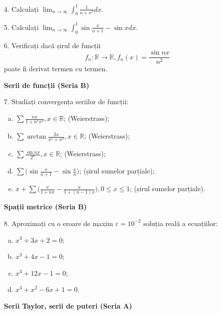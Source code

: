 \documentclass[11pt,a4paper]{article}
\newcommand\ds{\displaystyle}
\newcommand\RR{\mathbb{R}}
\theoremstyle{dotless}
\theoremstyle{dotlessdr}
\begin{document}
\vspace{1cm}

4. Calculați $\ds\lim_{n \to \infty} \int_0^1 \frac{1}{n + x^5} dx$.

\vspace{1cm}

5. Calculați $\ds\lim_{n \to \infty} \int_0^1 \sin \frac{x}{n + 1} - \sin x dx$.

\vspace{1cm}

6. Verificați dacă șirul de funcții
\[
  f_n : \RR \to \RR, f_n(x) = \frac{\sin nx}{n^2}
\]
poate fi derivat termen cu termen.

\vspace{1cm}

\textbf{Serii de funcții (Seria B)}

7. Studiați convergența seriilor de funcții:
\begin{enumerate}[(a)]
\item $\sum \frac{nx}{1 + n^5 x^2}, x \in \RR$; \hfill (Weierstrass);
\item $\sum \arctan \frac{2x}{x^2 + n^4}, x \in \RR$; \hfill (Weierstrass);
\item $\sum \frac{\sin nx}{2^n}, x \in \RR$; \hfill (Weierstrass);
\item $\sum \Big( \sin \frac{x}{n + 1} - \sin \frac{x}{n} \Big)$; \hfill (șirul sumelor
  parțiale);
\item $x + \sum \Big( \frac{x}{1 + nx} - \frac{x}{1 + (n-1) x} \Big), 0 \leq x \leq 1$;
  \hfill (șirul sumelor parțiale).
\end{enumerate}

\vspace{1cm}

\textbf{Spații metrice (Seria B)}

8. Aproximați cu o eroare de maxim $\varepsilon = 10^{-2}$ soluția reală a
ecuațiilor:
\begin{enumerate}[(a)]
\item $x^3 + 3x + 2 = 0$;
\item $x^3 + 4x - 1 = 0$;
\item $x^3 + 12 x - 1 = 0$;
\item $x^3 + x^2 - 6x + 1 = 0$. 
\end{enumerate}

\vspace{1cm}

\textbf{Serii Taylor, serii de puteri (Seria A)}
\end{document}
